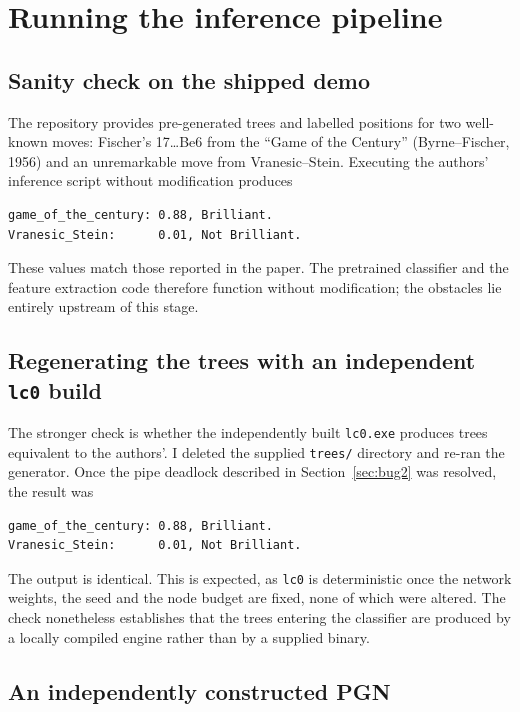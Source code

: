 \documentclass[11pt,a4paper]{article}
\begin{document}
\section{Running the inference pipeline}
\label{sec:inference}

\subsection{Sanity check on the shipped demo}

The repository provides pre-generated trees and labelled positions for
two well-known moves: Fischer's 17\dots Be6 from the ``Game of the
Century'' (Byrne--Fischer, 1956) and an unremarkable move from
Vranesic--Stein. Executing the authors' inference script without
modification produces

\begin{lstlisting}
game_of_the_century: 0.88, Brilliant.
Vranesic_Stein:      0.01, Not Brilliant.
\end{lstlisting}

These values match those reported in the paper. The pretrained
classifier and the feature extraction code therefore function without
modification; the obstacles lie entirely upstream of this stage.

\subsection{Regenerating the trees with an independent \texttt{lc0} build}

The stronger check is whether the independently built
\texttt{lc0.exe} produces trees equivalent to the authors'. I deleted
the supplied \texttt{trees/} directory and re-ran the generator. Once
the pipe deadlock described in Section~\ref{sec:bug2} was resolved,
the result was

\begin{lstlisting}
game_of_the_century: 0.88, Brilliant.
Vranesic_Stein:      0.01, Not Brilliant.
\end{lstlisting}

The output is identical. This is expected, as \texttt{lc0} is
deterministic once the network weights, the seed and the node budget
are fixed, none of which were altered. The check nonetheless
establishes that the trees entering the classifier are produced by a
locally compiled engine rather than by a supplied binary.

\subsection{An independently constructed PGN}
\label{sec:pgn}
\end{document}
